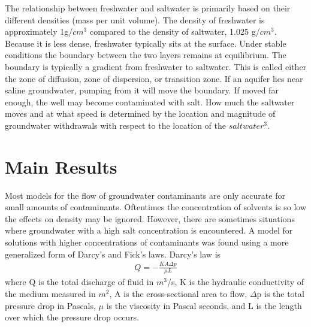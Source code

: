 \documentclass{article}
\begin{document}
The relationship between freshwater and saltwater is primarily based on their different densities (mass per unit volume). 
The density of freshwater is approximately 1g/$cm^3$ compared to the density of saltwater, 1.025 g/$cm^3$. 
Because it is less dense, freshwater typically sits at the surface.
Under stable conditions the boundary between the two layers remains at equilibrium. 
The boundary is typically a gradient from freshwater to saltwater. 
This is called either the zone of diffusion, zone of dispersion, or transition zone. 
If an aquifer lies near saline groundwater, pumping from it will move the boundary. 
If moved far enough, the well may become contaminated with salt. 
How much the saltwater moves and at what speed is determined by the location and magnitude of groundwater withdrawals with respect to the location of the $saltwater^3$.

\section*{Main Results}
Most models for the flow of groundwater contaminants are only accurate for small amounts of contaminants. 
Oftentimes the concentration of solvents is so low the effects on density may be ignored. 
However, there are sometimes situations where groundwater with a high salt concentration is encountered. 
A model for solutions with higher concentrations of contaminants was found using a more generalized form of Darcy’s and Fick’s laws\cite{1}. 
Darcy's law is 
    \begin{align}
        Q= - \frac{KA\Delta p}{\mu L}
    \end{align}
\noindent where Q is the total discharge of fluid in $m^3$/s, K is the hydraulic conductivity of the medium measured in $m^2$, A is the cross-sectional area to flow, $\Delta$p is the total pressure drop in Pascals, $\mu$ is the viscosity in Pascal seconds, and L is the length over which the pressure drop occurs. 
\end{document}
